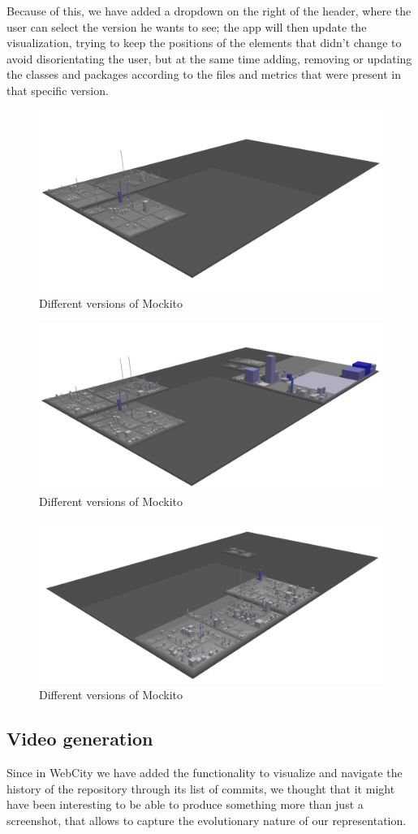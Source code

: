 \documentclass[]{usiinfbachelorproject}
\begin{document}
 Because of this, we have added a dropdown on the right of the header, where the user can select the version he wants to see; the app will then update the visualization, trying to keep the positions of the elements that didn't change to avoid disorientating the user, but at the same time adding, removing or updating the classes and packages according to the files and metrics that were present in that specific version.

 \begin{figure} [H]
 \centering
 \includegraphics[width=.6\textwidth]{pictures/version1.png}
 \caption{Different versions of Mockito}
 \label{fig:version1}
 \end{figure}

 \begin{figure} [H]
 \centering
 \includegraphics[width=.6\textwidth]{pictures/version2.png}
 \caption{Different versions of Mockito}
 \label{fig:version2}
 \end{figure}

 \begin{figure} [H]
 \centering
 \includegraphics[width=.6\textwidth]{pictures/version3.png}
 \caption{Different versions of Mockito}
 \label{fig:version3}
 \end{figure}

\subsection{Video generation} \label{Video generation}
Since in WebCity we have added the functionality to visualize and navigate the history of the repository through its list of commits, we thought that it might have been interesting to be able to produce something more than just a screenshot, that allows to capture the evolutionary nature of our representation.
\end{document}
